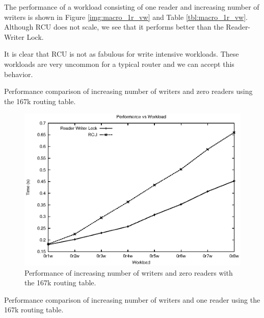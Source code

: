 \documentclass[a4paper,marginparwidth=50pt,marginparsep=10pt]{article}
\begin{document}
The performance of a workload consisting of one reader and increasing number of writers is shown in  Figure \ref{img:macro_1r_vw} and Table \ref{tbl:macro_1r_vw}. Although RCU does not scale, we see that it performs better than the Reader-Writer Lock.

It is clear that RCU is not as fabulous for write intensive workloads. These workloads are very uncommon for a typical router and we can accept this behavior.
 
\begin{table}[tph]
\begin{center}

\end{center}
\caption{Performance comparison of increasing number of writers and zero readers using the 167k routing table.}
\label{tbl:macro_0r_vw}
\end{table}


\begin{figure}[tph]
\includegraphics[scale = 0.7]{../images/graphs/macro_0r_vw}
\caption{Performance of increasing number of writers and zero readers with the 167k routing table.}
\label{img:macro_0r_vw}
\end{figure}


\begin{table}[tph]
\begin{center}

\end{center}
\caption{Performance comparison of increasing number of writers and one reader using the 167k routing table.}
\label{tbl:macro_1r_vw}
\end{table}
\end{document}
